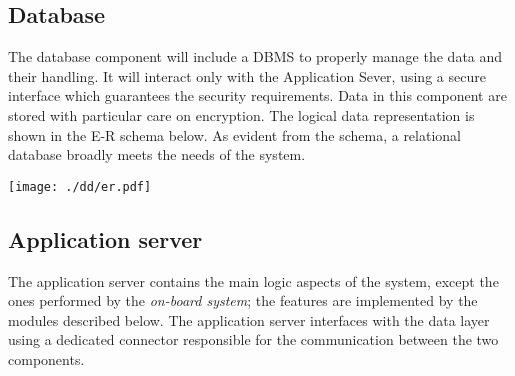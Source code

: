 \documentclass{scrreprt}
\begin{document}
\subsection{Database}
The database component will include a DBMS to properly manage the data and their handling. It will interact only with the Application Sever, using a secure interface which guarantees the security requirements. Data in this component are stored with particular care on encryption.
The logical data representation is shown in the E-R schema below.
As evident from the schema, a relational database broadly meets the needs of the system.

\begin{center}
		\texttt{[image: ./dd/er.pdf]}
\end{center}

\subsection{Application server}
The application server contains the main logic aspects of the system, except the ones performed by the \emph{on-board system}; the features are implemented by the modules described below.
The application server interfaces with the data layer using a dedicated connector responsible for the communication between the two components. 
\end{document}
